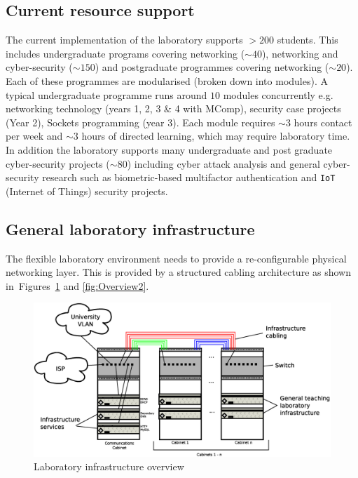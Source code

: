 \subsection{Current resource support}\label{ResourceSupport}
The current implementation of the laboratory supports $>200$ students. This includes undergraduate programs covering networking ($\sim40$), networking and cyber-security ($\sim150$) and postgraduate programmes covering networking ($\sim20$). Each of these programmes are modularised (broken down into modules).  A typical undergraduate programme runs around $10$ modules concurrently e.g. networking technology (years 1, 2, 3 \& 4 with MComp), security case projects (Year 2), Sockets programming (year 3). Each module requires $\sim3$ hours contact per week and $\sim3$ hours of directed learning, which may require laboratory time. In addition the laboratory supports many undergraduate and post graduate cyber-security projects ($\sim80$) including cyber attack analysis and general cyber-security research such as biometric-based multifactor authentication and \texttt{IoT} (Internet of Things) security projects.

\subsection{General laboratory infrastructure}
The flexible laboratory environment needs to provide a re-configurable physical networking layer. This is provided by a structured cabling architecture as shown in~Figures~\ref{fig:Overview1} and \ref{fig:Overview2}. 

\begin{figure}[h]
\begin{center}
	\includegraphics[scale=0.4]{Images/Infrastructure.eps}
\caption{Laboratory infrastructure overview}
\label{fig:Overview1}
\end{center}
\end{figure}

